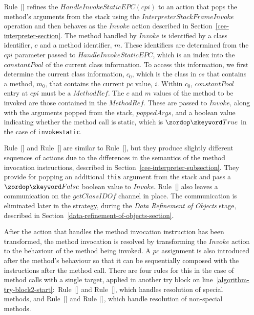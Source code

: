 Rule~[] refines the
$HandleInvokeStaticEPC(cpi)$ to an action that pops the method's
arguments from the stack using the $InterpreterStackFrameInvoke$
operation and then behaves as the $Invoke$ action described in
Section~\ref{cee-interpreter-section}.
The method handled by $Invoke$ is identified by a class identifier,
$c$ and a method identifier, $m$.
These identifiers are determined from the $cpi$ parameter passed to
$HandleInvokeStaticEPC$, which is an index into the $constantPool$ of
the current class information.
To access this information, we first determine the current class
information, $c_0$, which is the class in $cs$ that contains a method,
$m_0$, that contains the current $pc$ value, $i$.
Within $c_0$, $constantPool$ entry at $cpi$ must be a $MethodRef$.
The $c$ and $m$ values of the method to be invoked are those contained
in the $MethodRef$.
These are passed to $Invoke$, along with the arguments popped from the
stack, $poppedArgs$, and a boolean value indicating whether the method
call is static, which is $\true$ in the case of \texttt{invokestatic}.

Rule~[] and
Rule~[] are similar to
Rule~[], but they produce slightly
different sequences of actions due to the differences in the semantics
of the method invocation instructions, described in
Section~\ref{cee-interpreter-subsection}.
They provide for popping an additional \texttt{this} argument from the
stack and pass a $\false$ boolean value to $Invoke$.
Rule~[] also leaves a
communication on the $getClassIDOf$ channel in place.
The communication is eliminated later in the strategy, during the
\emph{Data Refinement of Objects} stage, described in
Section~\ref{data-refinement-of-objects-section}.

After the action that handles the method invocation instruction has
been transformed, the method invocation is resolved by transforming
the $Invoke$ action to the behaviour of the method being invoked.
A $pc$ assignment is also introduced after the method's behaviour so
that it can be sequentially composed with the instructions after the
method call.
There are four rules for this in the case of method calls with a
single target, applied in another try block on
line~\ref{algorithm-try-block2-start}:~Rule~[]
and Rule~[], which
handles resolution of special methods, and
Rule~[] and
Rule~[], which handle
resolution of non-special methods.

